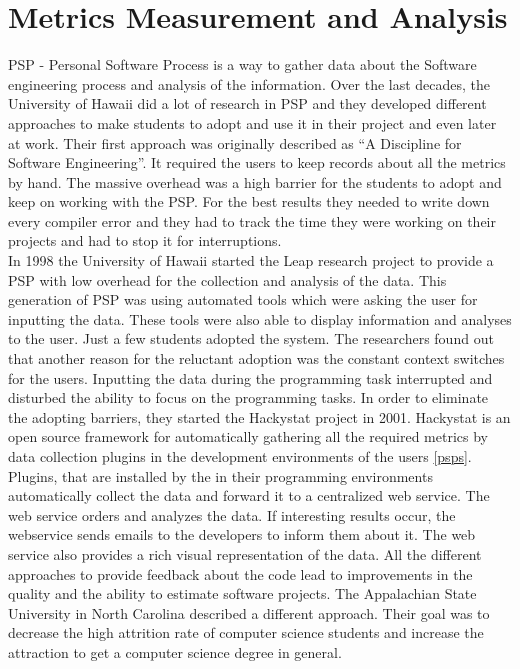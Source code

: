 \section{Metrics Measurement and Analysis}
PSP - Personal Software Process is a way to gather data about the Software engineering process and analysis of the information.
Over the last decades, the University of Hawaii did a lot of research in PSP and they developed different approaches to make students to adopt and use it in their project and even later at work.
Their first approach was originally described as ``A Discipline for Software Engineering''. It required the users to keep records about all the metrics by hand. The massive overhead was a high barrier for the students to adopt and keep on working with the PSP. For the best results they needed to write down every compiler error and they had to track the time they were working on their projects and had to stop it for interruptions.\\
In 1998 the University of Hawaii started the Leap research project to provide a PSP with low overhead for the collection and analysis of the data. This generation of PSP was using automated tools which were asking the user for inputting the data. These tools were also able to display information and analyses to the user.
Just a few students adopted the system. The researchers found out that another reason for the reluctant adoption was the constant context switches for the users. Inputting the data during the programming task interrupted and disturbed the ability to focus on the programming tasks. \cite{johnson2003beyond}
In order to eliminate the adopting barriers, they started the Hackystat project in 2001. Hackystat is an open source framework for automatically gathering all the required metrics by data collection plugins in the development environments of the users \ref{psps}.\\
Plugins, that are installed by the in their programming environments automatically collect the data and forward it to a centralized web service. The web service orders and analyzes the data. If interesting results occur, the webservice sends emails to the developers to inform them about it. The web service also provides a rich visual representation of the data.
All the different approaches to provide feedback about the code lead to improvements in the quality and the ability to estimate software projects. \cite{johnson2001project} 
The Appalachian State University in North Carolina described a different approach. Their goal was to decrease the high attrition rate of computer science students and increase the attraction to get a computer science degree in general.\\

